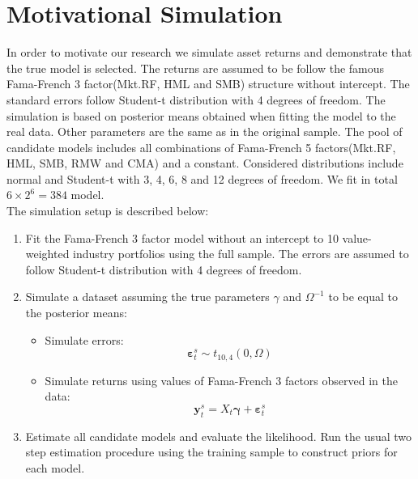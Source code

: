 \documentclass[12pt]{article}
\begin{document}
\section{Motivational Simulation}
In order to motivate our research we simulate asset returns and demonstrate that the true model is selected. The returns are assumed to be follow the famous Fama-French 3 factor(Mkt.RF, HML and SMB) structure without intercept. The standard errors follow Student-t distribution with 4 degrees of freedom. The simulation is based on posterior means obtained when fitting the model to the real data. Other parameters are the same as in the original sample. The pool of candidate models includes all combinations of Fama-French 5 factors(Mkt.RF, HML, SMB, RMW and CMA) and a constant. Considered distributions include normal and Student-t with 3, 4, 6, 8 and 12 degrees of freedom. We fit in total $6\times 2^{6} = 384$ model.  \\
The simulation setup is described below:
\begin{enumerate}
	\item Fit the Fama-French 3 factor model without an intercept to 10 value-weighted industry portfolios using the full sample. The errors are assumed to follow Student-t distribution with 4 degrees of freedom. 
	\item Simulate a dataset assuming the true parameters  $\gamma$ and $\Omega^{-1} $ to be equal to the posterior means:
	\begin{itemize}
		\item Simulate errors:
		 \begin{equation*}
		 \boldsymbol{\varepsilon}^s_{t}\sim t_{10,4 }\left( 0,\Omega \right)
		 \end{equation*}
		\item Simulate returns using values of Fama-French 3 factors observed in the data:
		\begin{equation*}
		\mathbf{y}_t^s = X_t \boldsymbol{\gamma} + \boldsymbol{\varepsilon}^s_t
		\end{equation*}
	\end{itemize}
	\item Estimate all candidate models and evaluate the likelihood. Run the usual two step estimation procedure using the training sample to construct priors for each model.  
\end{enumerate}
\end{document}
